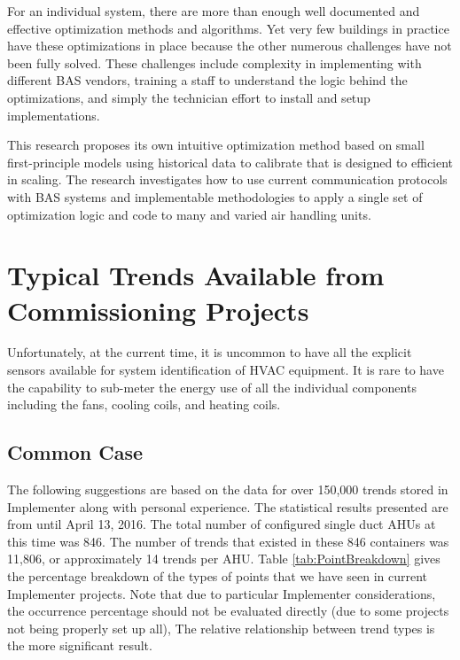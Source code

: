 For an individual system, there are more than enough well documented and
effective optimization methods and algorithms. Yet very few buildings in
practice have these optimizations in place because the other numerous
challenges have not been fully solved. These challenges include
complexity in implementing with different BAS vendors, training a staff
to understand the logic behind the optimizations, and simply the
technician effort to install and setup implementations.

This research proposes its own intuitive optimization method based on
small first-principle models using historical data to calibrate that is
designed to efficient in scaling. The research investigates how to use
current communication protocols with BAS systems and implementable
methodologies to apply a single set of optimization logic and code to
many and varied air handling units. 

\section{Typical Trends Available from Commissioning Projects}

Unfortunately, at the current time, it is uncommon to have all the
explicit sensors available for system identification of HVAC equipment.
It is rare to have the capability to sub-meter the energy use of all the
individual components including the fans, cooling coils, and heating
coils. 

\subsection{Common Case}

The following suggestions are based on the data for over 150,000 trends
stored in Implementer along with personal experience. The statistical
results presented are from until April 13, 2016. The total
number of configured single duct AHUs at this time was 846. The number
of trends that existed in these 846 containers was 11,806, or
approximately 14 trends per AHU. Table \ref{tab:PointBreakdown} gives
the percentage breakdown of the types of points that we have seen in
current Implementer projects. Note that due to particular Implementer
considerations, the occurrence percentage should not be evaluated
directly (due to some projects not being properly set up all), The
relative relationship between trend types is the more significant
result.  


